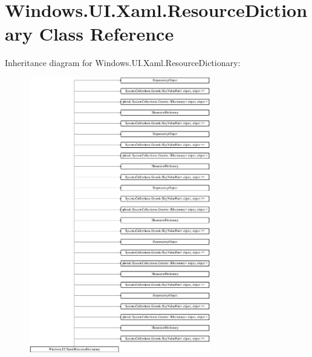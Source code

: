 \hypertarget{class_windows_1_1_u_i_1_1_xaml_1_1_resource_dictionary}{}\section{Windows.\+U\+I.\+Xaml.\+Resource\+Dictionary Class Reference}
\label{class_windows_1_1_u_i_1_1_xaml_1_1_resource_dictionary}
Inheritance diagram for Windows.\+U\+I.\+Xaml.\+Resource\+Dictionary\+:\begin{figure}[H]
\begin{center}
\leavevmode
\includegraphics[height=12.000000cm]{class_windows_1_1_u_i_1_1_xaml_1_1_resource_dictionary}
\end{center}
\end{figure}

